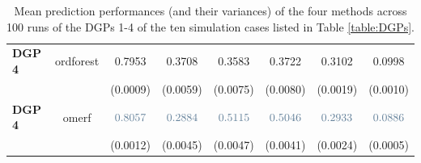 \begin{table}[H]
\begin{tabular}{|p{4em} c c c c c c c |}
    \textbf{DGP 4} & ordforest & 0.7953 & 0.3708 & 0.3583 & 0.3722 & 0.3102 & 0.0998 \T\B \\
    \textbf{} &  & (0.0009) & (0.0059) & (0.0075) & (0.0080) & (0.0019) & (0.0010) \T\B \\
    \textbf{DGP 4} & omerf & $\textcolor{bluePoli}{0.8057}$ & $\textcolor{bluePoli}{0.2884}$ & $\textcolor{bluePoli}{0.5115}$ & $\textcolor{bluePoli}{0.5046}$ & $\textcolor{bluePoli}{0.2933}$ & $\textcolor{bluePoli}{0.0886}$ \T\B \\
    \textbf{} &  & (0.0012) & (0.0045) & (0.0047) & (0.0041) & (0.0024) & (0.0005) \B \\
    \hline
    \end{tabular}
    \\[10pt]
    \caption{Mean prediction performances (and their variances) of the four methods across 100 runs of the DGPs 1-4 of the ten simulation cases listed in Table \ref{table:DGPs}.}
    \label{table:res_int}
\end{table}

